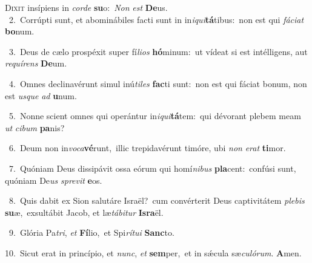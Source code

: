\lettrine{\initial\textcolor{\initialcolor}{D}}{ixit} insípiens in \textit{cor}\-\textit{de} \textbf{su}\-o:~\star \textit{Non} \textit{est} \textbf{De}\-us.\\
{\numbfont\textcolor{\numbcolor}{~2.}}~Corrúpti sunt, et abominábiles facti sunt in in\-\textit{i}\-\textit{qui}\textbf{tá}tibus:~\star non est qui \textit{fá}\-\textit{ci}\textit{at} \textbf{bo}\-num.\par
{\numbfont\textcolor{\numbcolor}{~3.}}~Deus de cælo prospéxit super fí\-\textit{li}\-\textit{os} \textbf{hó}\-minum:~\star ut vídeat si est intélligens, aut \textit{re}\-\textit{quí}\textit{rens} \textbf{De}\-um.\par
{\numbfont\textcolor{\numbcolor}{~4.}}~Omnes declinavérunt simul inú\-\textit{ti}\-\textit{les} \textbf{fac}\-ti sunt:~\star non est qui fáciat bonum, non est \textit{us}\-\textit{que} \textit{ad} \textbf{u}\-num.\par
{\numbfont\textcolor{\numbcolor}{~5.}}~Nonne scient omnes qui operántur in\-\textit{i}\-\textit{qui}\textbf{tá}tem:~\star qui dévorant plebem meam \textit{ut} \textit{ci}\-\textit{bum} \textbf{pa}\-nis?\par
{\numbfont\textcolor{\numbcolor}{~6.}}~Deum non in\-\textit{vo}\-\textit{ca}\textbf{vé}runt,~\star illic trepidavérunt timóre, ubi \textit{non} \textit{e}\-\textit{rat} \textbf{ti}\-mor.\par
{\numbfont\textcolor{\numbcolor}{~7.}}~Quóniam Deus dissipávit ossa eórum qui homí\-\textit{ni}\-\textit{bus} \textbf{pla}\-cent:~\star confúsi sunt, quóniam De\textit{us} \textit{spre}\-\textit{vit} \textbf{e}\-os.\par
{\numbfont\textcolor{\numbcolor}{~8.}}~Quis dabit ex Sion salutáre Israël?~\dagger cum convérterit Deus captivitátem \textit{ple}\-\textit{bis} \textbf{su}\-æ,~\star exsultábit Jacob, et læ\-\textit{tá}\-\textit{bi}\textit{tur} \textbf{Is}\-\textbf{ra}ël.\par
{\numbfont\textcolor{\numbcolor}{~9.}}~Glória Pa\-\textit{tri}\-, \textit{et} \textbf{Fí}\-lio,~\star et Spi\-\textit{rí}\-\textit{tu}\textit{i} \textbf{Sanc}\-to.\par
{\numbfont\textcolor{\numbcolor}{10.}}~Sicut erat in princípio, et \textit{nunc}\-, \textit{et} \textbf{sem}\-per,~\star et in sǽcula sæ\-\textit{cu}\-\textit{ló}\textit{rum}. \textbf{A}\-men.\par
